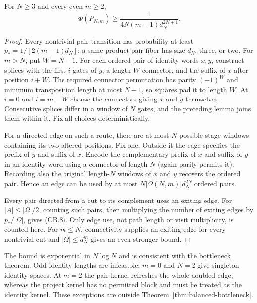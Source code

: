 \begin{proposition}
\label{prop:coarse-pair-conductance}
For $N\ge3$ and every even $m\ge2$,
\[
 \Phi(P_{N,m})\ge\frac1{4N(m-1)d_N^{2N+1}}.           \tag{CB.8}
\]
\end{proposition}
\begin{proof}
Every nontrivial pair transition has probability at least
$p_*=1/[2(m-1)d_N]$: a same-product pair fiber has size $d_N$, three,
or two.  For $m>N$, put $W=N-1$.  For each ordered pair of identity
words $x,y$, construct splices with the first $i$ gates of $y$, a
length-$W$ connector, and the suffix of $x$ after position $i+W$.
The required connector permutation has parity $(-1)^W$ and minimum
transposition length at most $N-1$, so squares pad it to length $W$.
At $i=0$ and $i=m-W$ choose the connectors giving $x$ and $y$ themselves.
Consecutive splices differ in a window of $N$ gates, and the preceding
lemma joins them within it.  Fix all choices deterministically.

For a directed edge on such a route, there are at most $N$ possible
stage windows containing its two altered positions.  Fix one.  Outside
it the edge specifies the prefix of $y$ and suffix of $x$.  Encode the
complementary prefix of $x$ and suffix of $y$ in an identity word using
a connector of length $N$ (again parity permits it).  Recording also
the original length-$N$ windows of $x$ and $y$ recovers the ordered
pair.  Hence an edge can be used by at most
$N|\Omega(N,m)|d_N^{2N}$ ordered pairs.

Every pair directed from a cut to its complement uses an exiting edge.
For $|A|\le|\Omega|/2$, counting such pairs, then multiplying the
number of exiting edges by $p_*/|\Omega|$, gives (CB.8).
Only edge use, not path length or visit multiplicity, is counted here.
For $m\le N$, connectivity supplies an exiting edge for every nontrivial
cut and $|\Omega|\le d_N^m$ gives an even stronger bound.
\end{proof}

The bound is exponential in $N\log N$ and is consistent with the
bottleneck theorem.  Odd identity lengths are infeasible; $m=0$ and
$N=2$ give singleton identity spaces.  At $m=2$ the pair kernel refreshes
the whole doubled edge, whereas the project kernel has no permitted
block and must be treated as the identity kernel.  These exceptions are
outside Theorem~\ref{thm:balanced-bottleneck}.
